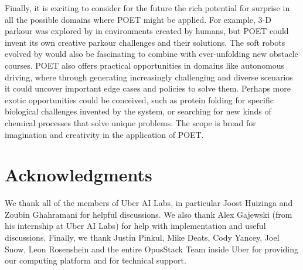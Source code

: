 \documentclass{article}
\newcommand{\jc}[1]{\comments{\textcolor{deepForestGreen}{[JC: #1]}}}
\newcommand{\comments}[1]{#1}
\begin{document}
Finally, it is exciting to consider for the future the rich potential for surprise in all the possible domains where POET might be applied.  For example, 3-D parkour was explored by \citet{heess:arxiv17} in environments created by humans, but POET could invent its own creative parkour challenges and their solutions.  The soft robots evolved by \citet{cheney:gecco13} would also be fascinating to combine with ever-unfolding new obstacle courses.  POET also offers practical opportunities in domains like autonomous driving, where through generating increasingly challenging and diverse scenarios it could uncover important edge cases and policies to solve them.  Perhaps more exotic opportunities could be conceived, such as protein folding for specific biological challenges invented by the system, or searching for new kinds of chemical processes that solve unique problems.  The scope is broad for imagination and creativity in the application of POET.  

\section*{Acknowledgments}

We thank all of the members of Uber AI Labs, in particular Joost Huizinga and Zoubin Ghahramani for helpful discussions.
We also thank Alex Gajewski (from his internship at Uber AI Labs) for help with implementation and useful discussions.   
Finally, we thank Justin
Pinkul, Mike Deats, Cody Yancey, Joel Snow, Leon Rosenshein and the entire OpusStack Team inside Uber for providing our computing platform and for technical support.


\end{document}
